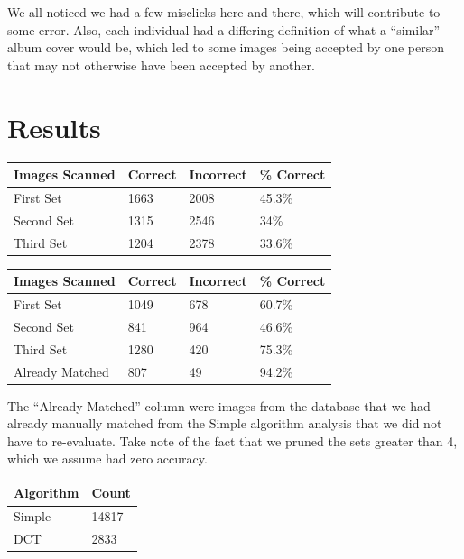 \documentclass[11pt,a4paper,titlepage]{article}
\begin{document}
We all noticed we had a few misclicks here and there, which will contribute to
some error.  Also, each individual had a differing definition of what a
``similar'' album cover would be, which led to some images being accepted by
one person that may not otherwise have been accepted by another.

\section{Results}

\begin{minipage}{\linewidth}
\centering
\begin{tabular}{|l|l|l|l|}
\hline
Images Scanned & Correct & Incorrect & \% Correct \\ \hline
First Set    & 1663    & 2008      & 45.3\% \\ \hline
Second Set   & 1315    & 2546      & 34\% \\ \hline
Third Set    & 1204    & 2378      & 33.6\% \\ \hline
\end{tabular}
\end{minipage}

\begin{minipage}{\linewidth}
\centering
\begin{tabular}{|l|l|l|l|}
\hline
Images Scanned & Correct & Incorrect & \% Correct \\ \hline
First Set       & 1049    & 678      & 60.7\% \\ \hline
Second Set      & 841     & 964      & 46.6\% \\ \hline
Third Set       & 1280    & 420      & 75.3\% \\ \hline
Already Matched & 807     & 49       & 94.2\% \\ \hline
\end{tabular}
\end{minipage}

The ``Already Matched'' column were images from the database that we had
already manually matched from the Simple algorithm analysis that we did not
have to re-evaluate.  Take note of the fact that we pruned the sets greater 
than 4, which we assume had zero accuracy.

\begin{minipage}{\linewidth}
\centering
\begin{tabular}{|l|l|}
\hline
Algorithm       & Count \\ \hline
Simple          & 14817 \\ \hline
DCT             & 2833  \\ \hline
\end{tabular}
\end{minipage}
\end{document}

